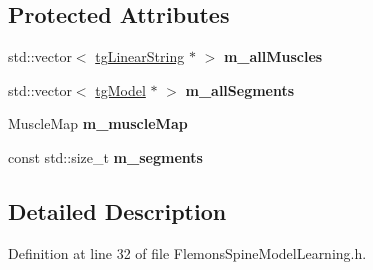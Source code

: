 \subsection*{Protected Attributes}
\begin{DoxyCompactItemize}
\item 
\hypertarget{class_base_spine_model_learning_a9cd74c4c79da8749fb5c8bffecede666}{std\-::vector$<$ \hyperlink{classtg_linear_string}{tg\-Linear\-String} $\ast$ $>$ {\bfseries m\-\_\-all\-Muscles}}\label{class_base_spine_model_learning_a9cd74c4c79da8749fb5c8bffecede666}

\item 
\hypertarget{class_base_spine_model_learning_a1c1e64b40b4c67189fbc67ad411f316a}{std\-::vector$<$ \hyperlink{classtg_model}{tg\-Model} $\ast$ $>$ {\bfseries m\-\_\-all\-Segments}}\label{class_base_spine_model_learning_a1c1e64b40b4c67189fbc67ad411f316a}

\item 
\hypertarget{class_base_spine_model_learning_a75cad2ae3b68f93d283550b417af5523}{Muscle\-Map {\bfseries m\-\_\-muscle\-Map}}\label{class_base_spine_model_learning_a75cad2ae3b68f93d283550b417af5523}

\item 
\hypertarget{class_base_spine_model_learning_a5d68dbbcbda4091b040279200a185d50}{const std\-::size\-\_\-t {\bfseries m\-\_\-segments}}\label{class_base_spine_model_learning_a5d68dbbcbda4091b040279200a185d50}

\end{DoxyCompactItemize}


\subsection{Detailed Description}


Definition at line 32 of file Flemons\-Spine\-Model\-Learning.\-h.



